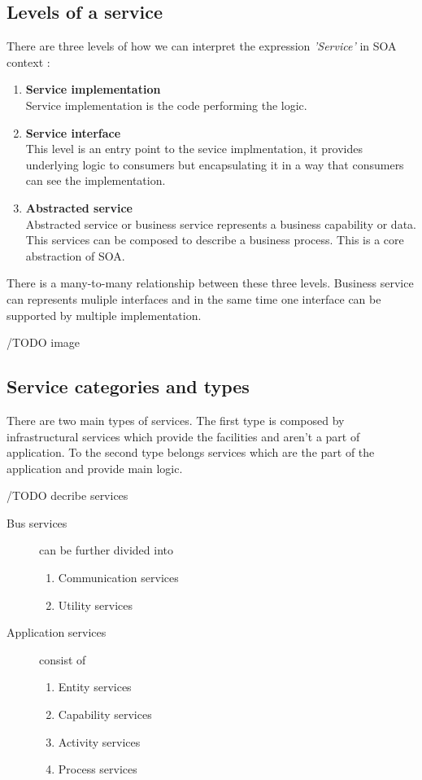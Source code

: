 \subsection{Levels of a service} 
\label{subsec:levels-of-serivce}

There are three levels of how we can interpret the expression \emph{'Service'} in SOA context \cite{agile-architecture}:
\begin{enumerate}
  \item \textbf{Service implementation} \hfill \\
Service implementation is the code performing the logic.
  \item \textbf{Service interface} \hfill \\ 
This level is an entry point to the sevice implmentation, it provides underlying logic to consumers but encapsulating it in a way that consumers can see the implementation. 
  \item \textbf{Abstracted service} \hfill \\
Abstracted service or business service represents a business capability or data. This services can be composed to describe a business process. This is a core abstraction of SOA.
\end{enumerate}

There is a many-to-many relationship between these three levels. Business service can represents muliple interfaces and in the same time one interface can be supported by multiple implementation.

/TODO image

\subsection{Service categories and types} \cite{website:ontology-taxonomy}

There are two main types of services. The first type is composed by infrastructural services which provide the facilities and aren't a part of application. To the second type belongs services which are the part of the application and provide main logic.

/TODO decribe services

\begin{description}
  \item[Bus services] can be further divided into 
  \begin{enumerate}
    \item Communication services 
    \item Utility services
  \end{enumerate}
  \item[Application services] consist of   
  \begin{enumerate}
    \item Entity services
    \item Capability services
    \item Activity services
    \item Process services
  \end{enumerate}
\end{description}

